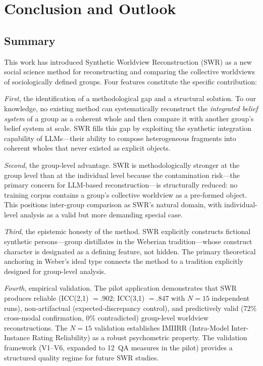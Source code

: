 \documentclass[11pt,a4paper]{article}
\theoremstyle{definition}
\theoremstyle{plain}
\theoremstyle{remark}
\begin{document}

\section{Conclusion and Outlook}
\label{sec:conclusion}

\subsection{Summary}

This work has introduced Synthetic Worldview Reconstruction (SWR) as a new social science method for reconstructing and comparing the collective worldviews of sociologically defined groups. Four features constitute the specific contribution:

\emph{First}, the identification of a methodological gap and a structural solution. To our knowledge, no existing method can systematically reconstruct the \emph{integrated belief system} of a group as a coherent whole and then compare it with another group's belief system at scale. SWR fills this gap by exploiting the synthetic integration capability of LLMs---their ability to compose heterogeneous fragments into coherent wholes that never existed as explicit objects.

\emph{Second}, the group-level advantage. SWR is methodologically stronger at the group level than at the individual level because the contamination risk---the primary concern for LLM-based reconstruction---is structurally reduced: no training corpus contains a group's collective worldview as a pre-formed object. This positions inter-group comparison as SWR's natural domain, with individual-level analysis as a valid but more demanding special case.

\emph{Third}, the epistemic honesty of the method. SWR explicitly constructs fictional synthetic persons---group distillates in the Weberian tradition---whose construct character is designated as a defining feature, not hidden. The primary theoretical anchoring in Weber's ideal type connects the method to a tradition explicitly designed for group-level analysis.

\emph{Fourth}, empirical validation. The pilot application demonstrates that SWR produces reliable (ICC(2,1) $= .902$; ICC(3,1) $= .847$ with $N = 15$ independent runs), non-artifactual (expected-discrepancy control), and predictively valid (72\% cross-modal confirmation, 0\% contradicted) group-level worldview reconstructions. The $N = 15$ validation establishes IMIIRR (Intra-Model Inter-Instance Rating Reliability) as a robust psychometric property. The validation framework (V1--V6, expanded to 12~QA measures in the pilot) provides a structured quality regime for future SWR studies.
\end{document}
